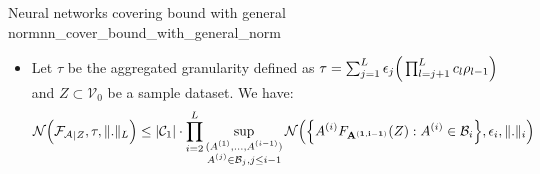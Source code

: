\begin{theorem}{Neural networks covering bound with general norm}{nn_cover_bound_with_general_norm}
\begin{itemize}
        \item Let $\tau$ be the aggregated granularity defined as $\tau = \sum_{j=1}^L \epsilon_j \Big( \prod_{l=j+1}^L c_l\rho_{l-1} \Big)$ and $Z\subset\mathcal{V}_0$ be a sample dataset. We have:
        \begin{align*}
            \mathcal{N}\Big( 
                {\mathcal{F}_\mathcal{A}}_{|Z}, \tau, \|.\|_L
             \Big) \le |\mathcal{C}_1|\cdot\prod_{i=2}^L \sup_{\substack{
                (A^{(1)}, \dots, A^{(i-1)}) \\
                A^{(j)} \in \mathcal{B}_j, j \le i-1
            }}\mathcal{N}\Big( 
                \Big\{ A^{(i)}F_{\bf A^{(1, i-1)}}(Z) : A^{(i)} \in \mathcal{B}_i \Big\}, \epsilon_i, \|.\|_i
             \Big)
        \end{align*}
    \end{itemize}
\end{theorem}

